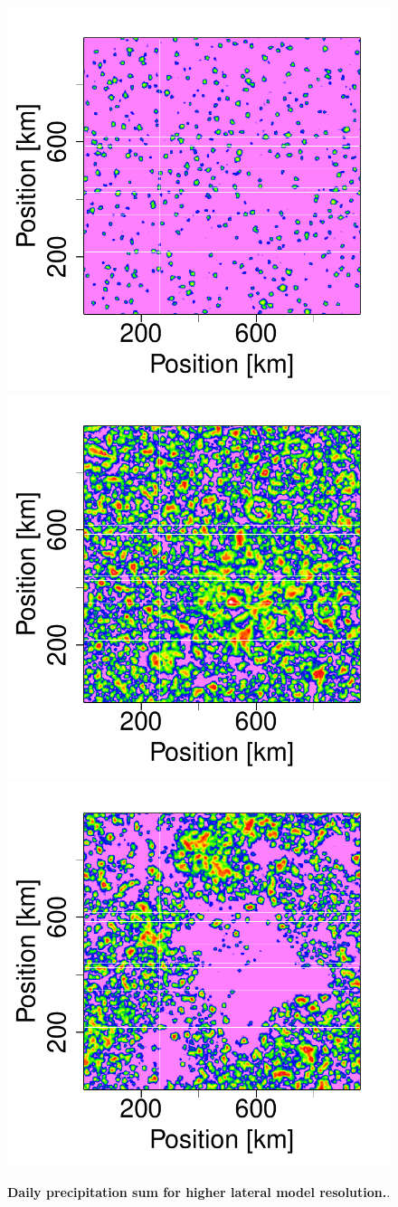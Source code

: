 \documentclass[draft,linenumbers]{agujournal2019}
\begin{document}
\begin{figure}
\centering
\includegraphics[trim={2cm 2.4cm 1cm 1cm}, clip, height=0.11\linewidth]{1-288_T0_300K_ampl_10_500m_r_int_timmean_xy_plot_l=2.pdf}
\includegraphics[trim={2cm 2.4cm 1cm 1cm}, clip, height=0.11\linewidth]{289-576_T0_300K_ampl_10_500m_r_int_timmean_xy_plot_l=2.pdf}
\includegraphics[trim={2cm 2.4cm 1cm 1cm}, clip, height=0.11\linewidth]{577-864_T0_300K_ampl_10_500m_r_int_timmean_xy_plot_l=2.pdf}
\caption{{\bf Daily precipitation sum for higher lateral model resolution.}. }
\label{fig:daily_sum_500m}
\end{figure}
\end{document}
